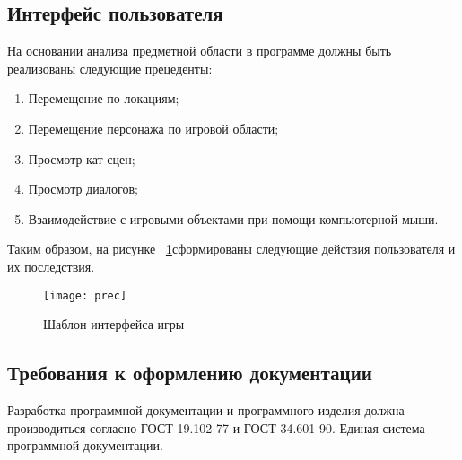 \subsection{Интерфейс пользователя}

На основании анализа предметной области в программе должны быть реализованы следующие прецеденты:
\begin{enumerate}
\item Перемещение по локациям;
\item Перемещение персонажа по игровой области;
\item Просмотр кат-сцен;
\item Просмотр диалогов;
\item Взаимодействие с игровыми объектами при помощи компьютерной мыши.
\end{enumerate}
Таким образом, на рисунке ~\ref{prec:image}сформированы следующие действия пользователя и их последствия.
\begin{figure}[ht]
	\texttt{[image: prec]}
	\caption{Шаблон интерфейса игры}
	\label{prec:image}
\end{figure}

\subsection{Требования к оформлению документации}

Разработка программной документации и программного изделия должна производиться согласно ГОСТ 19.102-77 и ГОСТ 34.601-90. Единая система программной документации.
